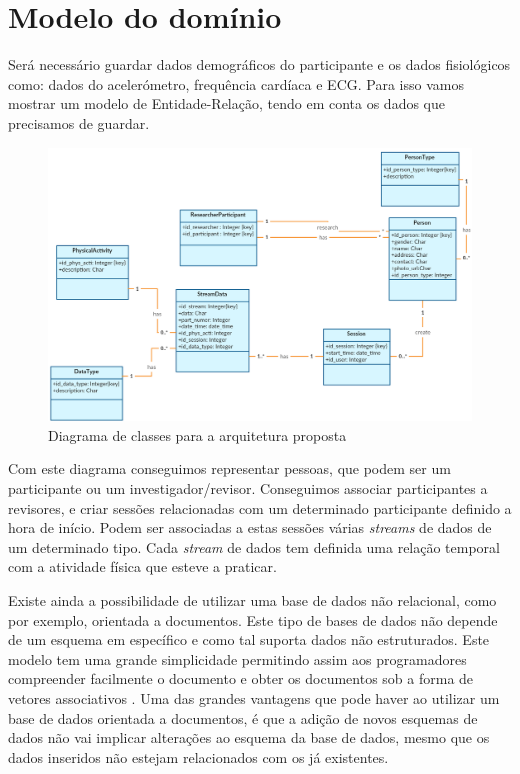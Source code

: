 \section{Modelo do domínio}
Será necessário guardar dados demográficos do participante e os dados fisiológicos como: dados do acelerómetro, frequência cardíaca e \gls{ECG}. Para isso vamos mostrar um modelo de Entidade-Relação, tendo em conta os dados que precisamos de guardar.

\begin{figure}[H]
  \centering
  \includegraphics[width=1\textwidth]{imgs/class-diagram.png}
  \caption[Diagrama de classes para a arquitetura proposta]{Diagrama de classes para a arquitetura proposta}
  
  \label{f:class-diagram}
\end{figure}

Com este diagrama conseguimos representar pessoas, que podem ser um participante ou um investigador/revisor. Conseguimos associar participantes a revisores, e criar sessões relacionadas com um determinado participante definido a hora de início. Podem ser associadas a estas sessões várias \textit{streams} de dados de um determinado tipo. Cada \textit{stream} de dados tem definida uma relação temporal com a atividade física que esteve a praticar.
\par 
Existe ainda a possibilidade de utilizar uma base de dados não relacional, como por exemplo, orientada a documentos. Este tipo de bases de dados não depende de um esquema em específico e como tal suporta dados não estruturados. Este modelo tem uma grande simplicidade permitindo assim aos programadores compreender facilmente o documento e obter os documentos sob a forma de vetores associativos \cite{nosql}. Uma das grandes vantagens que pode haver ao utilizar um base de dados orientada a documentos, é que a adição de novos esquemas de dados não vai implicar alterações ao esquema da base de dados, mesmo que os dados inseridos não estejam relacionados com os já existentes.





